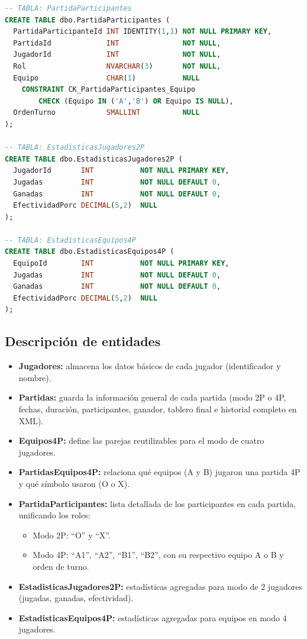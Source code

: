 \documentclass[11pt,a4paper]{article}
\begin{document}
\begin{lstlisting}[language=SQL]
-- TABLA: PartidaParticipantes
CREATE TABLE dbo.PartidaParticipantes (
  PartidaParticipanteId INT IDENTITY(1,1) NOT NULL PRIMARY KEY,
  PartidaId             INT               NOT NULL,
  JugadorId             INT               NOT NULL,
  Rol                   NVARCHAR(3)       NOT NULL,
  Equipo                CHAR(1)           NULL
    CONSTRAINT CK_PartidaParticipantes_Equipo 
        CHECK (Equipo IN ('A','B') OR Equipo IS NULL),
  OrdenTurno            SMALLINT          NULL
);

-- TABLA: EstadisticasJugadores2P
CREATE TABLE dbo.EstadisticasJugadores2P (
  JugadorId       INT           NOT NULL PRIMARY KEY,  
  Jugadas         INT           NOT NULL DEFAULT 0,
  Ganadas         INT           NOT NULL DEFAULT 0,
  EfectividadPorc DECIMAL(5,2)  NULL
);

-- TABLA: EstadisticasEquipos4P
CREATE TABLE dbo.EstadisticasEquipos4P (
  EquipoId        INT           NOT NULL PRIMARY KEY,  
  Jugadas         INT           NOT NULL DEFAULT 0,
  Ganadas         INT           NOT NULL DEFAULT 0,
  EfectividadPorc DECIMAL(5,2)  NULL
);
\end{lstlisting}

\subsection{Descripción de entidades}

\begin{itemize}
    \item \textbf{Jugadores:} almacena los datos básicos de cada jugador (identificador y nombre).
    \item \textbf{Partidas:} guarda la información general de cada partida (modo 2P o 4P, fechas, duración, 
          participantes, ganador, tablero final e historial completo en XML).
    \item \textbf{Equipos4P:} define las parejas reutilizables para el modo de cuatro jugadores.
    \item \textbf{PartidasEquipos4P:} relaciona qué equipos (A y B) jugaron una partida 4P y qué símbolo usaron (O o X).
    \item \textbf{PartidaParticipantes:} lista detallada de los participantes en cada partida, 
          unificando los roles:
          \begin{itemize}
              \item Modo 2P: ``O'' y ``X''.
              \item Modo 4P: ``A1'', ``A2'', ``B1'', ``B2'', con su respectivo equipo A o B y orden de turno.
          \end{itemize}
    \item \textbf{EstadisticasJugadores2P:} estadísticas agregadas para modo de 2 jugadores (jugadas, ganadas, efectividad).
    \item \textbf{EstadisticasEquipos4P:} estadísticas agregadas para equipos en modo 4 jugadores.
\end{itemize}
\end{document}
